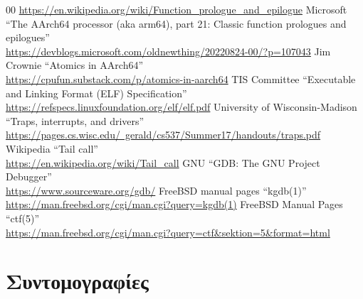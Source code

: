 \documentclass[12pt]{article}
\begin{document}
\begin{thebibliography}{00}
	\href{https://en.wikipedia.org/wiki/Function\_prologue\_and\_epilogue}{https://en.wikipedia.org/wiki/Function\_prologue\_and\_epilogue}
 Microsoft ``The AArch64 processor (aka arm64),
	part 21: Classic function prologues and epilogues'' \\
	\href{https://devblogs.microsoft.com/oldnewthing/20220824-00/?p=107043}{https://devblogs.microsoft.com/oldnewthing/20220824-00/?p=107043}
 Jim Crownie ``Atomics in AArch64'' \\
	\href{https://cpufun.substack.com/p/atomics-in-aarch64}{https://cpufun.substack.com/p/atomics-in-aarch64}
 TIS Committee ``Executable and Linking Format (ELF) Specification'' \\
	\href{https://refspecs.linuxfoundation.org/elf/elf.pdf}{https://refspecs.linuxfoundation.org/elf/elf.pdf}
 University of Wisconsin-Madison ``Traps, interrupts, and drivers'' \\
	\href{https://pages.cs.wisc.edu/~gerald/cs537/Summer17/handouts/traps.pdf}{https://pages.cs.wisc.edu/~gerald/cs537/Summer17/handouts/traps.pdf}
 Wikipedia ``Tail call'' \\
	\href{https://en.wikipedia.org/wiki/Tail\_call}{https://en.wikipedia.org/wiki/Tail\_call}
 GNU ``GDB: The GNU Project Debugger'' \\
	\href{https://www.sourceware.org/gdb/}{https://www.sourceware.org/gdb/}
 FreeBSD manual pages ``kgdb(1)'' \\
	\href{https://man.freebsd.org/cgi/man.cgi?query=kgdb(1)}{https://man.freebsd.org/cgi/man.cgi?query=kgdb(1)}
 FreeBSD Manual Pages ``ctf(5)'' \\
	\href{https://man.freebsd.org/cgi/man.cgi?query=ctf\&sektion=5\&format=html}{https://man.freebsd.org/cgi/man.cgi?query=ctf\&sektion=5\&format=html}
\end{thebibliography}

\pagebreak
\setcounter{secnumdepth}{0}
\section{Συντομογραφίες}
\end{document}
